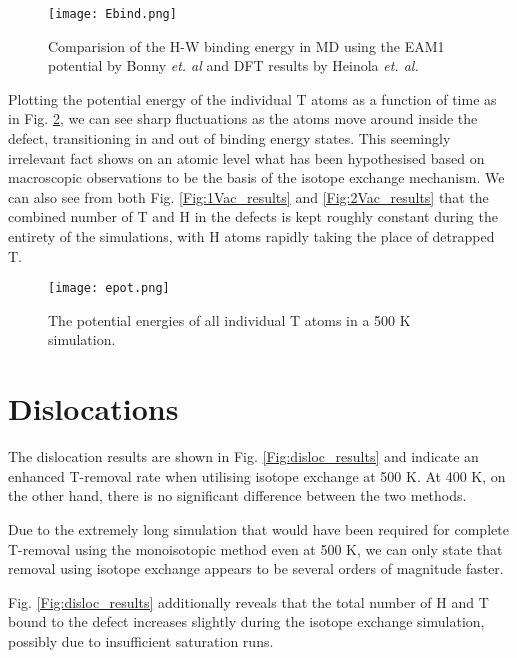 \begin{figure}[!ht]
	\center
	\texttt{[image: Ebind.png]}
	\caption{Comparision of the H-W binding energy in MD using the EAM1 potential by Bonny \textit{et. al} and DFT results by Heinola \textit{et. al. }\cite{heinolaTungstenDFT}}
	\label{Fig:Ebind1H_DFT}
\end{figure}

Plotting the potential energy of the individual T atoms as a function of time as in Fig. \ref{Fig:Epot}, we can see sharp fluctuations as the atoms move around inside the defect, transitioning in and out of binding energy states.
This seemingly irrelevant fact shows on an atomic level what has been hypothesised based on macroscopic observations to be the basis of the isotope exchange mechanism.
We can also see from both Fig. \ref{Fig:1Vac_results} and \ref{Fig:2Vac_results} that the combined number of T and H in the defects is kept roughly constant during the entirety of the simulations, with H atoms rapidly taking the place of detrapped T.

\begin{figure}[!ht]
	\center
	\texttt{[image: epot.png]}
	\caption{The potential energies of all individual T atoms in a 500 K simulation.\vspace*{6mm}}
	\label{Fig:Epot}
\end{figure}


\section{Dislocations}
The dislocation results are shown in Fig. \ref{Fig:disloc_results} and indicate an enhanced T-removal rate when utilising isotope exchange at 500 K. 
At 400 K, on the other hand, there is no significant difference between the two methods.

Due to the extremely long simulation that would have been required for complete T-removal using the monoisotopic method even at 500 K, we can only state that removal using isotope exchange appears to be several orders of magnitude faster.

Fig. \ref{Fig:disloc_results} additionally reveals that the total number of H and T bound to the defect increases slightly during the isotope exchange simulation, possibly due to insufficient saturation runs. 


